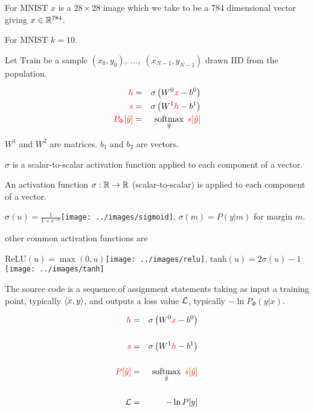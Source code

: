 {\vfill
For MNIST $x$ is a $28 \times 28$ image which we take to be a 784 dimensional vector giving $x \in \mathbb{R}^{784}$.

\vfill
For MNIST $k = 10$.

\vfill
Let $\mathrm{Train}$ be a sample $(x_0,y_0),\;\ldots,\;(x_{N-1},y_{N-1})$ drawn IID from the population.

\begin{eqnarray*}
  {\color{red} h} & = & \sigma\left(W^0{\color{red} x} - b^0\right) \\
  {\color{red} s} & = & \sigma\left(W^1{\color{red} h} - b^1 \right) \\
  {\color{red} P_\Phi[\hat{y}]} & = & \operatorname*{softmax}_{\hat{y}}\;{\color{red} s[\hat{y}]}
\end{eqnarray*}

\vfill
$W^1$ and $W^2$ are matrices. $b_1$ and $b_2$ are vectors.

\vfill
$\sigma$ is a scalar-to-scalar activation function applied to each component of a vector.


An activation function $\sigma:\mathbb{R} \rightarrow \mathbb{R}$ (scalar-to-scalar) is applied to each component of a vector.

\vfill
\centerline{{\color{red} $\sigma(u) = \frac{1}{1+e^{-u}}$}\hspace{3em}\texttt{[image: ../images/sigmoid]}, {\color{red} $\sigma(m) = P(y|m)$ for margin $m$}.}

\vfill
other common activation functions are

\vfill
\centerline{{\color{red} $\mathrm{ReLU}(u) = \max(0,u)$}\texttt{[image: ../images/relu]},
{\color{red} $\mathrm{tanh}(u) = 2\sigma(u)-1$}\texttt{[image: ../images/tanh]}}


The source code is a sequence of assignment statements taking as input a training point, typically ${\mbox{$\langle x,y\rangle$}}$,
and outputs a loss value ${\cal L}$, typically $-\ln P_\Phi(y|x)$.

\begin{eqnarray*}
  {\color{red} h} & = & \sigma\left(W^0{\color{red} x} - b^0\right) \\
  \\
  {\color{red} s} & = & \sigma\left(W^1{\color{red} h} - b^1 \right) \\
  \\
  {\color{red} P[\hat{y}]} & = & \operatorname*{softmax}_{\hat{y}}\;{\color{red} s[\hat{y}]} \\
  \\
  {\cal L} & = & - \ln P[y]
\end{eqnarray*}

}

